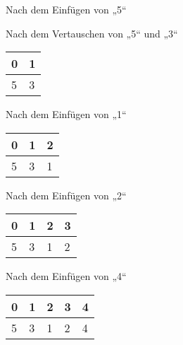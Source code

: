 \documentclass{bschlangaul-aufgabe}
\begin{document}
\begin{enumerate}
\begin{enumerate}
\begin{bAntwort}
\begin{bBaum}{Nach dem Einfügen von „5“}
\end{bBaum}

\begin{bBaum}{Nach dem Vertauschen von „5“ und „3“}
\begin{tabular}{ll}
\bf{0} & \bf{1} \\
\hline
5      & 3      \\
\end{tabular}

\end{bBaum}

\begin{bBaum}{Nach dem Einfügen von „1“}
\begin{tabular}{lll}
\bf{0} & \bf{1} & \bf{2} \\
\hline
5      & 3      & 1      \\
\end{tabular}

\end{bBaum}

\begin{bBaum}{Nach dem Einfügen von „2“}
\begin{tabular}{llll}
\bf{0} & \bf{1} & \bf{2} & \bf{3} \\
\hline
5      & 3      & 1      & 2      \\
\end{tabular}

\end{bBaum}

\begin{bBaum}{Nach dem Einfügen von „4“}
\begin{tabular}{lllll}
\bf{0} & \bf{1} & \bf{2} & \bf{3} & \bf{4} \\
\hline
5      & 3      & 1      & 2      & 4      \\
\end{tabular}


\end{bBaum}
\end{bAntwort}
\end{enumerate}
\end{enumerate}
\end{document}
